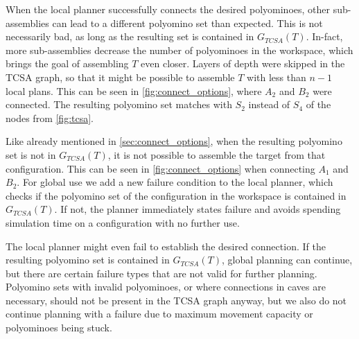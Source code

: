 When the local planner successfully connects the desired polyominoes, other sub-assemblies can lead to a different polyomino set than expected.
This is not necessarily bad, as long as the resulting set is contained in $G_{TCSA}(T)$.
In-fact, more sub-assemblies decrease the number of polyominoes in the workspace, which brings the goal of assembling $T$ even closer.
Layers of depth were skipped in the TCSA graph, so that it might be possible to assemble $T$ with less than $n-1$ local plans.
This can be seen in \autoref{fig:connect_options}, where $A_2$ and $B_2$ were connected. 
The resulting polyomino set matches with $S_2$ instead of $S_4$ of the nodes from \autoref{fig:tcsa}.

Like already mentioned in \autoref{sec:connect_options}, when the resulting polyomino set is not in $G_{TCSA}(T)$, it is not possible to assemble the target from that configuration.
This can be seen in \autoref{fig:connect_options} when connecting $A_1$ and $B_2$.
For global use we add a new failure condition to the local planner, which checks if the polyomino set of the configuration in the workspace is contained in $G_{TCSA}(T)$.
If not, the planner immediately states failure and avoids spending simulation time on a configuration with no further use.

The local planner might even fail to establish the desired connection.
If the resulting polyomino set is contained in $G_{TCSA}(T)$, global planning can continue, but there are certain failure types that are not valid for further planning.
Polyomino sets with invalid polyominoes, or where connections in caves are necessary, should not be present in the TCSA graph anyway, but we also do not continue planning with a failure due to maximum movement capacity or polyominoes being stuck.

